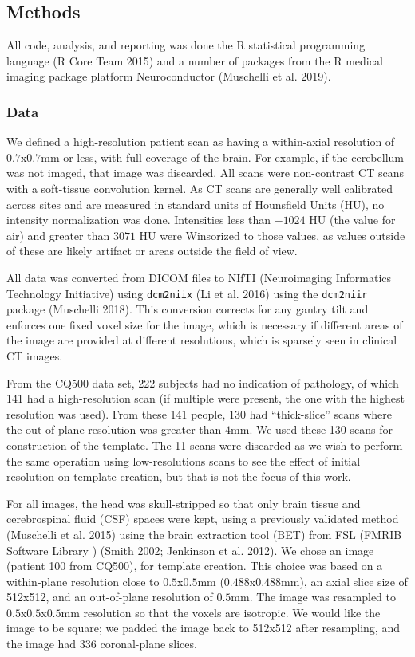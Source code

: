 \documentclass[]{elsarticle} %
\begin{document}
\hypertarget{methods}{%
\subsection{Methods}\label{methods}}

All code, analysis, and reporting was done the R statistical programming language (R Core Team 2015) and a number of packages from the R medical imaging package platform Neuroconductor (Muschelli et al. 2019).

\hypertarget{data}{%
\subsubsection{Data}\label{data}}

We defined a high-resolution patient scan as having a within-axial resolution of \(0.7\)x\(0.7\)mm or less, with full coverage of the brain. For example, if the cerebellum was not imaged, that image was discarded. All scans were non-contrast CT scans with a soft-tissue convolution kernel. As CT scans are generally well calibrated across sites and are measured in standard units of Hounsfield Units (HU), no intensity normalization was done. Intensities less than \(-1024\) HU (the value for air) and greater than \(3071\) HU were Winsorized to those values, as values outside of these are likely artifact or areas outside the field of view.

All data was converted from DICOM files to NIfTI (Neuroimaging Informatics Technology Initiative) using \texttt{dcm2niix} (Li et al. 2016) using the \texttt{dcm2niir} package (Muschelli 2018). This conversion corrects for any gantry tilt and enforces one fixed voxel size for the image, which is necessary if different areas of the image are provided at different resolutions, which is sparsely seen in clinical CT images.

From the CQ500 data set, 222 subjects had no indication of pathology, of which 141 had a high-resolution scan (if multiple were present, the one with the highest resolution was used). From these 141 people, 130 had ``thick-slice'' scans where the out-of-plane resolution was greater than \(4\)mm. We used these 130 scans for construction of the template. The 11 scans were discarded as we wish to perform the same operation using low-resolutions scans to see the effect of initial resolution on template creation, but that is not the focus of this work.

For all images, the head was skull-stripped so that only brain tissue and cerebrospinal fluid (CSF) spaces were kept, using a previously validated method (Muschelli et al. 2015) using the brain extraction tool (BET) from FSL (FMRIB Software Library
) (Smith 2002; Jenkinson et al. 2012). We chose an image (patient 100 from CQ500), for template creation. This choice was based on a within-plane resolution close to \(0.5\)x\(0.5\)mm (\(0.488\)x\(0.488\)mm), an axial slice size of 512x512, and an out-of-plane resolution of \(0.5\)mm. The image was resampled to \(0.5\)x\(0.5\)x\(0.5\)mm resolution so that the voxels are isotropic. We would like the image to be square; we padded the image back to 512x512 after resampling, and the image had 336 coronal-plane slices.
\end{document}
